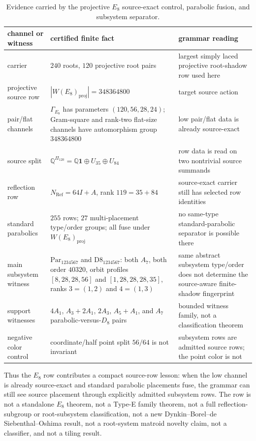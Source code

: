 \begin{table}[!htbp]
\centering
\caption{Evidence carried by the projective \(E_8\) source-exact control, parabolic fusion, and subsystem separator.}
\label{tab:e8-root-shadow-subsystem-separator}
\begin{tabular}{@{}L{0.25\textwidth}L{0.31\textwidth}L{0.34\textwidth}@{}}
\toprule
channel or witness & certified finite fact & grammar reading \\
\midrule
carrier & \(240\) roots, \(120\) projective root pairs & largest simply laced projective root-shadow row used here \\
projective source row & \(|W(E_8)_{\mathrm{proj}}|=348364800\) & target source action \\
pair/flat channels & \(\Gamma_{E_8}\) has parameters \((120,56,28,24)\); Gram-square and rank-two flat-size channels have automorphism group \(348364800\) & low pair/flat data is already source-exact \\
source split & \(\mathbb Q^{\Pi_{120}}=\mathbb Q\mathbf1\oplus U_{35}\oplus U_{84}\) & row data is read on two nontrivial source summands \\
reflection row & \(N_{\mathrm{Ref}}=64I+A\), rank \(119=35+84\) & source-exact carrier still has selected row identities \\
standard parabolics & \(255\) rows; \(27\) multi-placement type/order groups; all fuse under \(W(E_8)_{\mathrm{proj}}\) & no same-type standard-parabolic separator is possible there \\
main subsystem witness & \(\mathrm{Par}_{1234567}\) and \(\mathrm{D8}_{1234567}\): both \(A_7\), both order \(40320\), orbit profiles \([8,28,28,56]\) and \([1,28,28,28,35]\), ranks \(3=(1,2)\) and \(4=(1,3)\) & same abstract subsystem type/order does not determine the source-aware finite-shadow fingerprint \\
support witnesses & \(4A_1\), \(A_3+2A_1\), \(2A_3\), \(A_5+A_1\), and \(A_7\) parabolic-versus-\(D_8\) pairs & bounded witness family, not a classification theorem \\
negative color control & coordinate/half point split \(56/64\) is not invariant & subsystem rows are admitted source rows; the point color is not \\
\bottomrule
\end{tabular}
\end{table}

Thus the \(E_8\) row contributes a compact source-row lesson: when the low channel is already source-exact and standard parabolic placements fuse, the grammar can still see source placement through explicitly admitted subsystem rows.  The row is not a standalone \(E_8\) theorem, not a Type-E family theorem, not a full reflection-subgroup or root-subsystem classification, not a new Dynkin--Borel--de Siebenthal--Oshima result, not a root-system matroid novelty claim, not a classifier, and not a tiling result.
